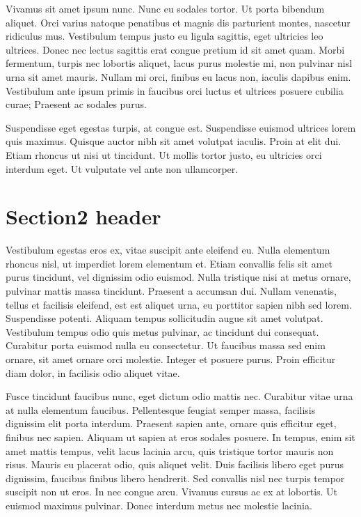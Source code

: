 \documentclass{article}
\begin{document}
Vivamus sit amet ipsum nunc. Nunc eu sodales tortor. Ut porta bibendum aliquet. Orci varius natoque penatibus et magnis dis parturient montes, nascetur ridiculus mus. Vestibulum tempus justo eu ligula sagittis, eget ultricies leo ultrices. Donec nec lectus sagittis erat congue pretium id sit amet quam. Morbi fermentum, turpis nec lobortis aliquet, lacus purus molestie mi, non pulvinar nisl urna sit amet mauris. Nullam mi orci, finibus eu lacus non, iaculis dapibus enim. Vestibulum ante ipsum primis in faucibus orci luctus et ultrices posuere cubilia curae; Praesent ac sodales purus.

Suspendisse eget egestas turpis, at congue est. Suspendisse euismod ultrices lorem quis maximus. Quisque auctor nibh sit amet volutpat iaculis. Proin at elit dui. Etiam rhoncus ut nisi ut tincidunt. Ut mollis tortor justo, eu ultricies orci interdum eget. Ut vulputate vel ante non ullamcorper.

\section{Section2 header}

Vestibulum egestas eros ex, vitae suscipit ante eleifend eu. Nulla elementum rhoncus nisl, ut imperdiet lorem elementum et. Etiam convallis felis sit amet purus tincidunt, vel dignissim odio euismod. Nulla tristique nisi at metus ornare, pulvinar mattis massa tincidunt. Praesent a accumsan dui. Nullam venenatis, tellus et facilisis eleifend, est est aliquet urna, eu porttitor sapien nibh sed lorem. Suspendisse potenti. Aliquam tempus sollicitudin augue sit amet volutpat. Vestibulum tempus odio quis metus pulvinar, ac tincidunt dui consequat. Curabitur porta euismod nulla eu consectetur. Ut faucibus massa sed enim ornare, sit amet ornare orci molestie. Integer et posuere purus. Proin efficitur diam dolor, in facilisis odio aliquet vitae.

Fusce tincidunt faucibus nunc, eget dictum odio mattis nec. Curabitur vitae urna at nulla elementum faucibus. Pellentesque feugiat semper massa, facilisis dignissim elit porta interdum. Praesent sapien ante, ornare quis efficitur eget, finibus nec sapien. Aliquam ut sapien at eros sodales posuere. In tempus, enim sit amet mattis tempus, velit lacus lacinia arcu, quis tristique tortor mauris non risus. Mauris eu placerat odio, quis aliquet velit. Duis facilisis libero eget purus dignissim, faucibus finibus libero hendrerit. Sed convallis nisl nec turpis tempor suscipit non ut eros. In nec congue arcu. Vivamus cursus ac ex at lobortis. Ut euismod maximus pulvinar. Donec interdum metus nec molestie lacinia.
\end{document}
